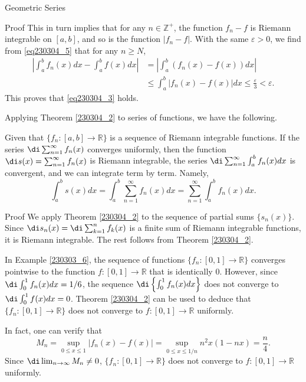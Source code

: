 \begin{example}[label=230305_16]{Geometric Series}
\begin{example}[label=230304_9]{}
\begin{myproof}{Proof}
 This in turn implies that for any $n\in\mathbb{Z}^+$, the function $f_n-f$ is Riemann integrable on $[a,b]$, and so is the function $|f_n-f|$.
With the same $\varepsilon>0$, we find from \eqref{eq230304_5} that for any $n\geq N$,
\begin{align*}
\left|\int_a^bf_n(x)dx-\int_a^b f(x)dx\right|&=\left|\int_a^b(f_n(x)-f(x))dx\right|\\&\leq \int_a^b\left|f_n(x)-f(x) \right|dx\leq \frac{\varepsilon}{3}<\varepsilon.
\end{align*}This proves that \eqref{eq230304_3} holds.
 
\end{myproof}

Applying Theorem \ref{230304_2} to series of functions, we have the following.
\begin{corollary}[label=230305_11]{}
Given that $\{f_n:[a,b]\rightarrow \mathbb{R}\}$ is a sequence of Riemann integrable functions. If the series $\di\sum_{n=1}^{\infty}f_n(x)$ converges uniformly, then the function $\di s(x)=\sum_{n=1}^{\infty}f_n(x)$ is Riemann integrable, the series $\di \sum_{n=1}^{\infty}\int_a^bf_n(x)dx$ is convergent, and we can integrate term by term. Namely,
\[\int_a^bs(x)dx=\int_a^b \sum_{n=1}^{\infty}f_n(x)dx=\sum_{n=1}^{\infty}\int_a^bf_n(x)dx.\] 
\end{corollary}
\begin{myproof}{Proof}
We apply  Theorem \ref{230304_2} to the sequence of partial sums $\{s_n(x)\}$. Since $\di s_n(x)=\di\sum_{k=1}^nf_k(x)$ is a finite sum of Riemann integrable functions, it is Riemann integrable. The rest follows from Theorem \ref{230304_2}.
\end{myproof}
\begin{example}{}
In Example \ref{230303_6}, the sequence of functions $\{f_n:[0,1]\to\mathbb{R}\}$ converges pointwise to the function $f:[0,1]\to\mathbb{R}$ that is identically 0. However, since
$\di\int_0^1f_n(x)dx=1/6$, the sequence $\di\left\{\int_0^1f_n(x)dx\right\}$ does not converge to $\di\int_0^1f(x)dx=0$. Theorem \ref{230304_2} can be used to deduce that $\{f_n:[0,1]\to\mathbb{R}\}$ does not converge to $f:[0,1]\to\mathbb{R}$ uniformly. 

In fact, one can verify that 
\[M_n=\sup_{0\leq x\leq 1}|f_n(x)-f(x)|=\sup_{0\leq x\leq 1/n}n^2x\left(1-nx\right)=\frac{n}{4}.\]Since $\di\lim_{n\to\infty}M_n\neq 0$,    $\{f_n:[0,1]\to\mathbb{R}\}$ does not converge to $f:[0,1]\to\mathbb{R}$ uniformly. 
\end{example}




\end{example}
\end{example}
